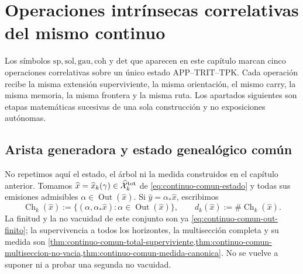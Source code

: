 \chapter{Operaciones intrínsecas correlativas del mismo continuo}
\label{chap:pdfv2-operaciones-intrinsecas-correlativas}

\begin{thesisbox}
Los símbolos \(\mathrm{sp},\mathrm{sol},\mathrm{gau},\mathrm{coh}\) y
\(\mathrm{det}\) que aparecen en este capítulo marcan cinco operaciones
correlativas sobre un único estado APP--TRIT--TPK\@. Cada operación recibe
la misma extensión superviviente, la
misma orientación, el mismo carry, la misma memoria, la misma frontera y la
misma ruta. Los apartados siguientes son etapas matemáticas sucesivas de una
sola construcción y no exposiciones autónomas.
\end{thesisbox}

\section{Arista generadora y estado genealógico común}

No repetimos aquí el estado, el árbol ni la medida construidos en el capítulo
anterior. Tomamos
\(\widehat x=\widehat x_k(\gamma)\in
\widehat{\mathcal X}^{\rm tot}_k\) de
\eqref{eq:continuo-comun-estado} y todas sus emisiones admisibles
\(\alpha\in\operatorname{Out}(\widehat x)\). Si
\(\widehat y=\alpha_*\widehat x\), escribimos
\begin{equation}
\label{eq:pdfv2-cor-hijos-supervivientes}
 \operatorname{Ch}_k(\widehat x):=
 \{(\alpha,\alpha_*\widehat x):
      \alpha\in\operatorname{Out}(\widehat x)\},
 \qquad
 d_k(\widehat x):=\#\operatorname{Ch}_k(\widehat x).
\end{equation}
La finitud y la no vacuidad de este conjunto son ya
\eqref{eq:continuo-comun-out-finito}; la supervivencia a todos los horizontes,
la multisección completa y su medida son
\cref{thm:continuo-comun-total-superviviente,thm:continuo-comun-multiseccion-no-vacia,thm:continuo-comun-medida-canonica}. No se vuelve a suponer ni a probar una
segunda no vacuidad.


